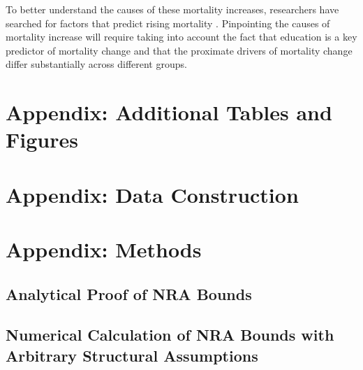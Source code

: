 \documentclass[12pt,letterpaper]{article}
\numberwithin{equation}{section}
\newcommand{\HOME}{\string~}
\begin{document}
To better understand the causes of these mortality increases, researchers have searched for factors that predict rising mortality \citep{Cutler2011,Case2017,Ruhm2018}. Pinpointing the causes of mortality increase will require taking into account the fact that education is a key predictor of mortality change and that the proximate drivers of mortality change differ substantially across different groups.

\begin{appendix}

\newpage
\singlespace





\floatbarrier
\clearpage

\floatbarrier

\newpage 
\renewcommand{\thetable}{A\arabic{table}}
\setcounter{table}{0}
\renewcommand{\thefigure}{A\arabic{figure}}
\setcounter{figure}{0}
\section{Appendix: Additional Tables and Figures} 
\label{sec:app_figs}


\newpage 
\clearpage 
\section{Appendix: Data Construction}
\label{sec:app_data}
\normalsize  

\newpage 
\clearpage
\section{Appendix: Methods}
\renewcommand{\thefigure}{C\arabic{figure}}
\setcounter{figure}{0}
\renewcommand{\thetable}{C\arabic{table}}
\setcounter{table}{0}

\subsection{Analytical Proof of NRA Bounds}
\label{sec:app_proofs}
\normalsize  

\subsection{Numerical Calculation of NRA Bounds with Arbitrary Structural Assumptions} 
\label{sec:app_numerical} 
\normalsize 


\end{appendix}
\end{document}
